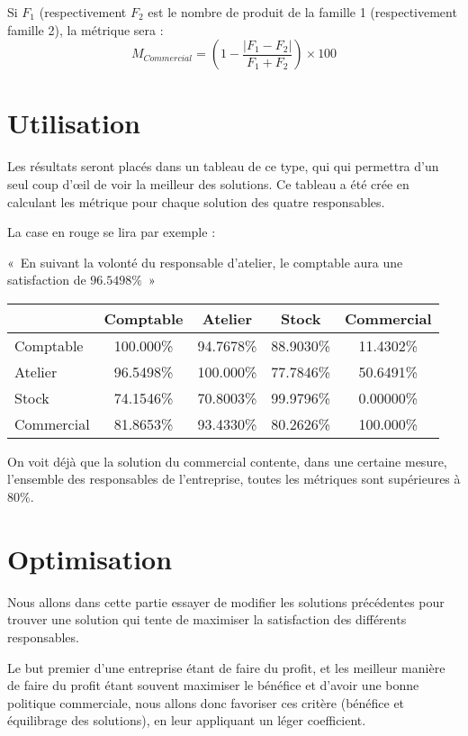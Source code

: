 Si $F_1$ (respectivement $F_2$ est le nombre de produit de la famille 1
(respectivement famille 2), la métrique sera :
$$
M_{Commercial} = \left( 1 - \frac{|F_1 - F_2|}{F_1 + F_2} \right) \times 100
$$

\section{Utilisation}
Les résultats seront placés dans un tableau de ce type, qui qui permettra d'un
seul coup d'œil de voir la meilleur des solutions. Ce tableau a été crée en
calculant les métrique pour chaque solution des quatre responsables.

La case en rouge se lira par exemple : 

\begin{center}
«~En suivant la volonté du responsable d'atelier, le comptable aura une
satisfaction de $96.5498\%$~»
\end{center}

    \begin{center}
	\begin{tabular}{|l|c|c|c|c|}
	    \hline
	    \cellcolor[gray]{0.9} & Comptable& Atelier & Stock & Commercial  \\
	    \hline
	    Comptable & 100.000\% & 94.7678\% & 88.9030\% & 11.4302\% \\
	    \hline
	    Atelier   & \cellcolor{red}96.5498\% & 100.000\% & 77.7846\% & 50.6491\% \\
	    \hline
	    Stock     & 74.1546\% & 70.8003\% & 99.9796\% & 0.00000\% \\
	    \hline
	    Commercial& 81.8653\% & 93.4330\% & 80.2626\% & 100.000\% \\
	    \hline
	\end{tabular}
    \end{center}

On voit déjà que la solution du commercial contente, dans une certaine mesure,
l'ensemble des responsables de l'entreprise, toutes les métriques sont
supérieures à 80\%.

\section{Optimisation}
Nous allons dans cette partie essayer de modifier les solutions précédentes
pour trouver une solution qui tente de maximiser la satisfaction des différents
responsables.

Le but premier d'une entreprise étant de faire du profit, et les meilleur 
manière de faire du profit étant souvent maximiser le bénéfice et d'avoir une
bonne politique commerciale, nous allons donc favoriser ces critère (bénéfice et
équilibrage des solutions), en leur appliquant un léger coefficient.

